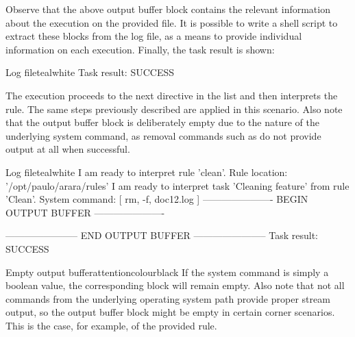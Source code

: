 
Observe that the above output buffer block contains the relevant information about the  execution on the provided file. It is possible to write a shell script to extract these blocks from the log file, as a means to provide individual information on each execution. Finally, the task result is shown:

\begin{codebox}{Log file}{teal}{\icnote}{white}
Task result: SUCCESS
\end{codebox}

The execution proceeds to the next directive in the list and then interprets the  rule. The same steps previously described are applied in this scenario. Also note that the output buffer block is deliberately empty due to the nature of the underlying system command, as removal commands such as  do not provide output at all when successful.

\begin{codebox}{Log file}{teal}{\icnote}{white}
I am ready to interpret rule 'clean'.
Rule location: '/opt/paulo/arara/rules'
I am ready to interpret task 'Cleaning feature' from rule 'Clean'.
System command: [ rm, -f, doc12.log ]
---------------------- BEGIN OUTPUT BUFFER ----------------------

----------------------- END OUTPUT BUFFER -----------------------
Task result: SUCCESS
\end{codebox}

\begin{messagebox}{Empty output buffer}{attentioncolour}{\icattention}{black}
If the system command is simply a boolean value, the corresponding block will remain empty. Also note that not all commands from the underlying operating system path provide proper stream output, so the output buffer block might be empty in certain corner scenarios. This is the case, for example, of the provided  rule.
\end{messagebox}

